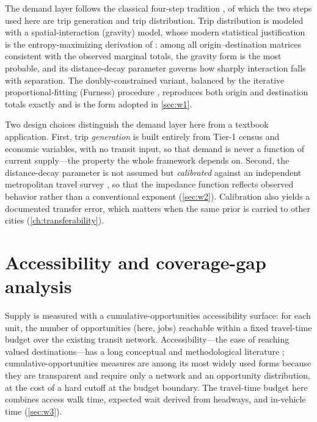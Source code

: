 The demand layer follows the classical four-step tradition
\parencite{mcnally2000fourstep, ortuzar2011}, of which the two steps used here are trip
generation and trip distribution. Trip distribution is modeled with a spatial-interaction
(gravity) model, whose modern statistical justification is the entropy-maximizing
derivation of \textcite{wilson1971gravity}: among all origin--destination matrices
consistent with the observed marginal totals, the gravity form is the most probable, and
its distance-decay parameter governs how sharply interaction falls with separation. The
doubly-constrained variant, balanced by the iterative proportional-fitting (Furness)
procedure \parencite{furness1965}, reproduces both origin and destination totals exactly
and is the form adopted in \cref{sec:w1}.

Two design choices distinguish the demand layer here from a textbook application. First,
trip \emph{generation} is built entirely from Tier-1 census and economic variables, with
no transit input, so that demand is never a function of current supply---the property
the whole framework depends on. Second, the distance-decay parameter is not assumed but
\emph{calibrated} against an independent metropolitan travel survey
\parencite{imeplan_eod2022}, so that the impedance function reflects observed behavior
rather than a conventional exponent (\cref{sec:w2}). Calibration also yields a documented
transfer error, which matters when the same prior is carried to other cities
(\cref{ch:transferability}).

\section{Accessibility and coverage-gap analysis}
\label{sec:lit-accessibility}

Supply is measured with a cumulative-opportunities accessibility surface: for each unit,
the number of opportunities (here, jobs) reachable within a fixed travel-time budget over
the existing transit network. Accessibility---the ease of reaching valued
destinations---has a long conceptual and methodological literature
\parencite{handy1997, geurs2004}; cumulative-opportunities measures are among its most
widely used forms because they are transparent and require only a network and an
opportunity distribution, at the cost of a hard cutoff at the budget boundary. The
travel-time budget here combines access walk time, expected wait derived from headways,
and in-vehicle time (\cref{sec:w3}).

